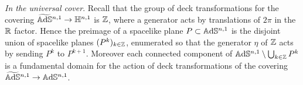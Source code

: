 \noindent\textit{In the universal cover}.
Recall that the group of deck transformations for the covering $\widetilde{\mathbb{A}\mathrm{d}\mathbb{S}}{}^{n,1} \to \mathbb{H}^{n,1}$ is $\mathbb{Z}$, where a generator acts by translations of $2\pi$ in the $\mathbb{R}$ factor. Hence the  preimage of a spacelike plane $P\subset\mathbb{A}\mathrm{d}\mathbb{S}^{n,1}$ is the disjoint union of spacelike planes $(P^k)_{k\in\mathbb{Z}}$, enumerated so that the generator $\eta$ of $\mathbb{Z}$ acts by sending $P^k$ to $P^{k+1}$.
Moreover each connected component of $\mathbb{A}\mathrm{d}\mathbb{S}^{n,1}\setminus\bigcup_{k\in\mathbb{Z}}P^k$ is a fundamental  domain for the action of deck transformations of the covering $\widetilde{\mathbb{A}\mathrm{d}\mathbb{S}}{}^{n,1}\to\mathbb{A}\mathrm{d}\mathbb{S}^{n,1}$.